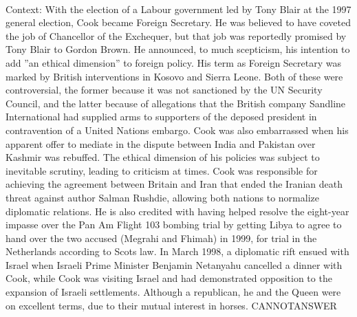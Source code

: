 \documentclass[11pt,a4paper, onecolumn]{article}
\begin{document}
\\ Context: With the election of a Labour government led by Tony Blair at the 1997 general election, Cook became Foreign Secretary. He was believed to have coveted the job of Chancellor of the Exchequer, but that job was reportedly promised by Tony Blair to Gordon Brown. He announced, to much scepticism, his intention to add ''an ethical dimension'' to foreign policy. His term as Foreign Secretary was marked by British interventions in Kosovo and Sierra Leone. Both of these were controversial, the former because it was not sanctioned by the UN Security Council, and the latter because of allegations that the British company Sandline International had supplied arms to supporters of the deposed president in contravention of a United Nations embargo. Cook was also embarrassed when his apparent offer to mediate in the dispute between India and Pakistan over Kashmir was rebuffed. The ethical dimension of his policies was subject to inevitable scrutiny, leading to criticism at times. Cook was responsible for achieving the agreement between Britain and Iran that ended the Iranian death threat against author Salman Rushdie, allowing both nations to normalize diplomatic relations. He is also credited with having helped resolve the eight-year impasse over the Pan Am Flight 103 bombing trial by getting Libya to agree to hand over the two accused (Megrahi and Fhimah) in 1999, for trial in the Netherlands according to Scots law. In March 1998, a diplomatic rift ensued with Israel when Israeli Prime Minister Benjamin Netanyahu cancelled a dinner with Cook, while Cook was visiting Israel and had demonstrated opposition to the expansion of Israeli settlements. Although a republican, he and the Queen were on excellent terms, due to their mutual interest in horses. CANNOTANSWER
\end{document}
